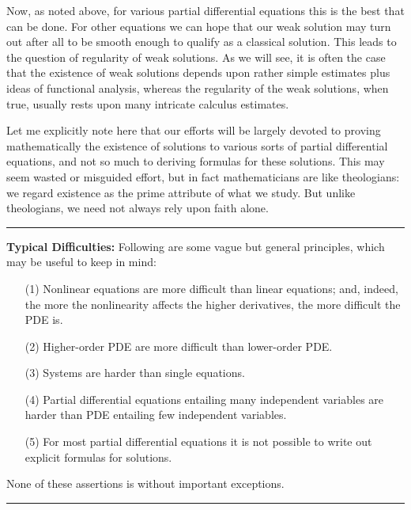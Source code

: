 Now, as noted above, for various partial differential equations this is
the best that can be done. For other equations we can hope that our weak
solution may turn out after all to be smooth enough to qualify as a classical
solution. This leads to the question of regularity of weak solutions. As we
will see, it is often the case that the existence of weak solutions depends
upon rather simple estimates plus ideas of functional analysis, whereas the
regularity of the weak solutions, when true, usually rests upon many intricate
calculus estimates.

Let me explicitly note here that our efforts will be largely devoted to proving mathematically the existence of solutions to various sorts of partial differential equations, and not so much to deriving formulas for these solutions. This may seem wasted or misguided
effort, but in fact mathematicians are like theologians: we regard existence
as the prime attribute of what we study. But unlike theologians, we need
not always rely upon faith alone.

\vspace{1em}
\hrule
\vspace{1em}
\noindent \textbf{Typical Difficulties:} Following are some vague but general principles, which may be useful to
keep in mind:
\begin{itemize}
    \item [(1)] Nonlinear equations are more difficult than linear equations; and,
    indeed, the more the nonlinearity affects the higher derivatives, the
    more difficult the PDE is.
    \item [(2)] Higher-order PDE are more difficult than lower-order PDE.
    \item [(3)] Systems are harder than single equations.
    \item [(4)] Partial differential equations entailing many independent variables
    are harder than PDE entailing few independent variables.
    \item [(5)] For most partial differential equations it is not possible to write out
    explicit formulas for solutions.
\end{itemize}
None of these assertions is without important exceptions.
\vspace{1em}
\hrule